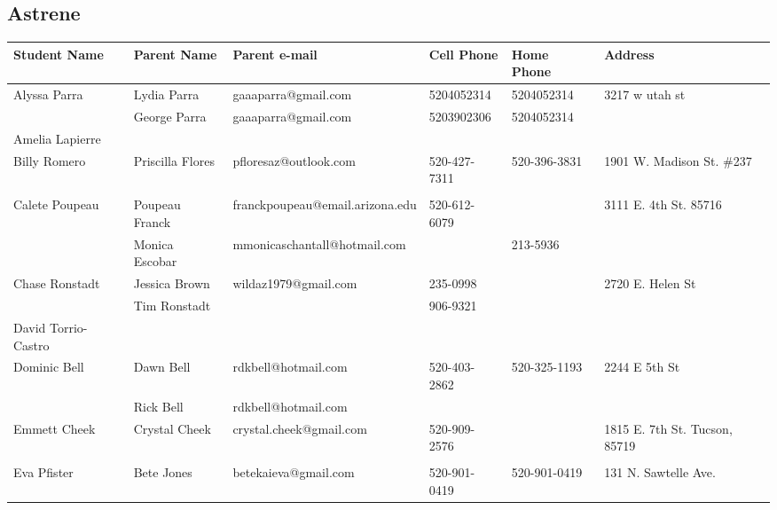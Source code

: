\documentclass[landscape]{article}\usepackage[]{graphicx}\usepackage[]{color}
\begin{document}
\subsection{Astrene}
\begin{longtable}{|p{100pt}|p{100pt}|p{140pt}|p{60pt}|p{64pt}|p{120pt}|}
\textbf{Student Name} & \textbf{Parent Name} & \textbf{Parent e-mail} & \textbf{Cell Phone} & \textbf{Home Phone} & \textbf{Address}\\
\hline
\hline
\multirow{2}{100pt}{Alyssa Parra} & Lydia Parra & gaaaparra@gmail.com & 5204052314 & 5204052314 & \multirow{2}{120pt}{3217 w utah st} \\
 & George Parra & gaaaparra@gmail.com & 5203902306 & 5204052314 & \\
\hline
\multirow{2}{100pt}{Amelia Lapierre} &  &  &  &  & \multirow{2}{120pt}{} \\
 &  &  &  &  & \\
\hline
\multirow{2}{100pt}{Billy Romero} & Priscilla Flores & pfloresaz@outlook.com & 520-427-7311 & 520-396-3831 & \multirow{2}{120pt}{1901 W. Madison St. \#237} \\
 &  &  &  &  & \\
\hline
\multirow{2}{100pt}{Calete Poupeau} & Poupeau Franck & franckpoupeau@email.arizona.edu & 520-612-6079 &  & \multirow{2}{120pt}{3111 E. 4th St. 85716} \\
 & Monica Escobar & mmonicaschantall@hotmail.com &  & 213-5936 & \\
\hline
\multirow{2}{100pt}{Chase Ronstadt} & Jessica Brown & wildaz1979@gmail.com & 235-0998 &  & \multirow{2}{120pt}{2720 E. Helen St} \\
 & Tim Ronstadt &  & 906-9321 &  & \\
\hline
\multirow{2}{100pt}{David Torrio-Castro} &  &  &  &  & \multirow{2}{120pt}{} \\
 &  &  &  &  & \\
\hline
\multirow{2}{100pt}{Dominic Bell} & Dawn Bell & rdkbell@hotmail.com & 520-403-2862 & 520-325-1193 & \multirow{2}{120pt}{2244 E 5th St} \\
 & Rick Bell & rdkbell@hotmail.com &  &  & \\
\hline
\multirow{2}{100pt}{Emmett Cheek} & Crystal Cheek & crystal.cheek@gmail.com & 520-909-2576 &  & \multirow{2}{120pt}{1815 E. 7th St. Tucson, 85719} \\
 &  &  &  &  & \\
\hline
\multirow{2}{100pt}{Eva Pfister} & Bete Jones & betekaieva@gmail.com & 520-901-0419 & 520-901-0419 & \multirow{2}{120pt}{131 N. Sawtelle Ave.} \\

\end{longtable}
\end{document}
